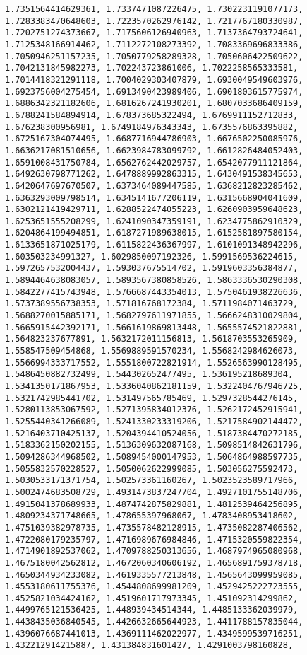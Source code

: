 \documentclass[11pt]{article}
\begin{document}
\begin{Verbatim}[commandchars=\\\{\}]
1.7351564414629361, 1.7337471087226475, 1.7302231191077173, 1.7283383470648603, 1.7223570262976142, 1.7217767180330987, 1.7202751274373667, 1.7175606126940963, 1.7137364793724641, 1.7125348166914462, 1.7112272108273392, 1.7083369696833386, 1.7050946251157235, 1.7050779258289328, 1.7050606422509622, 1.7042131845982273, 1.702243723861006, 1.7022258565333581, 1.7014418321291118, 1.7004029303407879, 1.6930049549603976, 1.6923756004275454, 1.6913490423989406, 1.6901803615775974, 1.6886342321182606, 1.6816267241930201, 1.6807033686409159, 1.6788241584894914, 1.678373685322494, 1.6769911152712833, 1.676238300956981, 1.6749184976343343, 1.6735576863395882, 1.6725167304074495, 1.6687716944786903, 1.6676502250085976, 1.6636217081510656, 1.6623984783099792, 1.6612826484052403, 1.6591008431750784, 1.6562762442029757, 1.6542077911121864, 1.6492630798771262, 1.6478889992863315, 1.6430491538345653, 1.6420647697670507, 1.6373464089447585, 1.6368212823285462, 1.6363293009798514, 1.6345141677206119, 1.6315668904041609, 1.6302121419429711, 1.6288522474055223, 1.6260903959648623, 1.6253651555208299, 1.6241090347359191, 1.6234775862910329, 1.6204864199494851, 1.6187271989638015, 1.6152581897580154, 1.6133651871025179, 1.6115822436367997, 1.6101091348942296, 1.603503234991327, 1.6029850097192326, 1.5991569536224615, 1.5972657532004437, 1.593037675514702, 1.5919603356384877, 1.5894464638083057, 1.5893567380858526, 1.5863336530290308, 1.5842277415743948, 1.5766687443354013, 1.5750461938226636, 1.5737389556738353, 1.571816768172384, 1.5711984071463729, 1.5688270015885171, 1.5682797611971855, 1.5666248310029804, 1.5665915442392171, 1.5661619869813448, 1.5655574521822881, 1.564823237677891, 1.5632172011156813, 1.5618703553265909, 1.558547509454868, 1.5569889591570234, 1.5568242984626073, 1.5566994333717552, 1.5551800722821914, 1.5526563990128495, 1.5486450882732499, 1.544302652477495, 1.536195218689304, 1.5341350171867953, 1.5336040862181159, 1.5322404767946725, 1.5321742985441702, 1.531497565785469, 1.5297328544276145, 1.5280113853067592, 1.5271395834012376, 1.5262172452915941, 1.5255440341266089, 1.5241330233319206, 1.5217584902144472, 1.5216403710425137, 1.5204394410524056, 1.5187384470272185, 1.5183362150202155, 1.5136309632087168, 1.5098514842631796, 1.5094286344968502, 1.5089454000147953, 1.5064864988597735, 1.5055832570228527, 1.5050062622999085, 1.503056275592473, 1.5030533171371754, 1.502573361160267, 1.5023523589717966, 1.5002474683508729, 1.4931473837247704, 1.4927101755148706, 1.4915041378689933, 1.4874742875829881, 1.4812539464256895, 1.4809234371748665, 1.478655397968067, 1.4783408953418602, 1.4751039382978735, 1.4735578482128915, 1.4735082287406562, 1.4722080179235797, 1.4716989676984846, 1.4715320559822354, 1.4714901892537062, 1.4709788250313656, 1.4687974965080968, 1.4675180042562812, 1.4672060340606192, 1.4656891759378718, 1.4650344934233082, 1.4619335577213848, 1.4565643099959085, 1.4553180611755376, 1.4544808699981209, 1.4529425222723555, 1.4525821034424162, 1.4519601717973345, 1.451092314299862, 1.4499765121536425, 1.448939434514344, 1.4485133362039979, 1.4438435036840545, 1.4426632665644923, 1.4411788157835044, 1.4396076687441013, 1.4369111462022977, 1.4349599539716251, 1.432212914215887, 1.431384831601427, 1.4291003798160828, 
\end{Verbatim}
\end{document}
